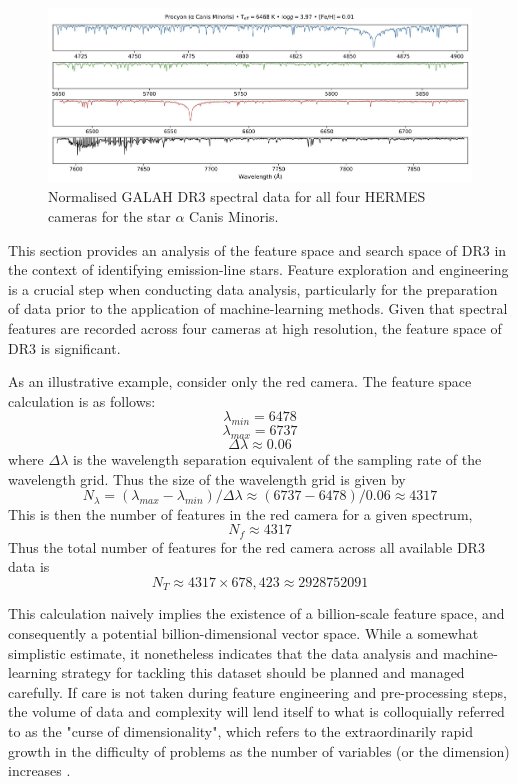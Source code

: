 \begin{figure}[!htb]
\centering
\includegraphics[scale=.25]{figures/galah cameras.jpeg}
\caption{Normalised GALAH DR3 spectral data for all four HERMES cameras for the star $\alpha$ Canis Minoris.}
\end{figure}

This section provides an analysis of the feature space and search space of DR3 in the context of identifying emission-line stars. Feature exploration and engineering is a crucial step when conducting data analysis, particularly for the preparation of data prior to the application of machine-learning methods. Given that spectral features are recorded across four cameras at high resolution, the feature space of DR3 is significant. 

As an illustrative example, consider only the red camera. The feature space calculation is as follows:
\[\lambda_{min} = 6478\]
\[\lambda_{max} = 6737\]
\[\Delta\lambda \approx 0.06\]
where $\Delta\lambda$ is the wavelength separation equivalent of the sampling rate of the wavelength grid. Thus the size of the wavelength grid is given by \[N_{\lambda} = (\lambda_{max}-\lambda_{min})/\Delta\lambda \approx (6737-6478)/0.06 \approx 4317\]
This is then the number of features in the red camera for a given spectrum, \[N_{f} \approx 4317\]
Thus the total number of features for the red camera across all available DR3 data is \[N_{T} \approx 4317\times678,423 \approx \num[round-precision=2,round-mode=figures,
     scientific-notation=true]{2928752091}\]

This calculation naively implies the existence of a billion-scale feature space, and consequently a potential billion-dimensional vector space. While a somewhat simplistic estimate, it nonetheless indicates that the data analysis and machine-learning strategy for tackling this dataset should be planned and managed carefully. If care is not taken during feature engineering and pre-processing steps, the volume of data and complexity will lend itself to what is colloquially referred to as the "curse of dimensionality", which refers to the extraordinarily rapid growth in the difficulty of problems as the number of variables (or the dimension) increases \citep{kuo2005lifting}.

